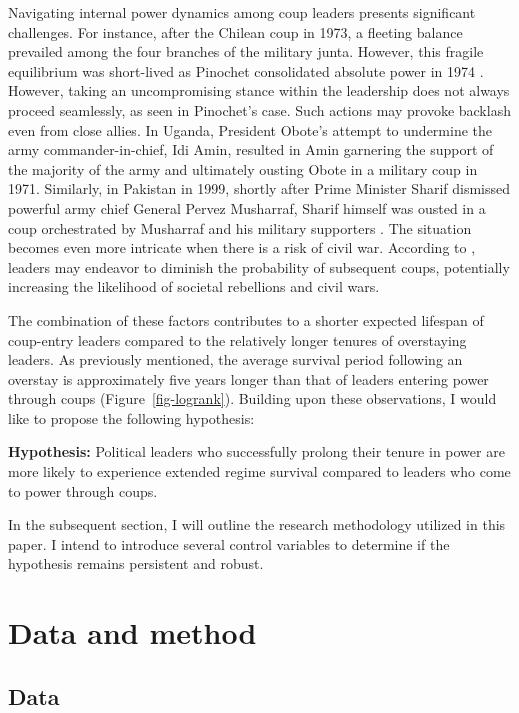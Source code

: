 \documentclass[
  12pt,
  a4paper,
  12pt]{article}
\begin{document}
Navigating internal power dynamics among coup leaders presents
significant challenges. For instance, after the Chilean coup in 1973, a
fleeting balance prevailed among the four branches of the military
junta. However, this fragile equilibrium was short-lived as Pinochet
consolidated absolute power in 1974 \citep{geddes2018}. However, taking
an uncompromising stance within the leadership does not always proceed
seamlessly, as seen in Pinochet's case. Such actions may provoke
backlash even from close allies. In Uganda, President Obote's attempt to
undermine the army commander-in-chief, Idi Amin, resulted in Amin
garnering the support of the majority of the army and ultimately ousting
Obote in a military coup in 1971. Similarly, in Pakistan in 1999,
shortly after Prime Minister Sharif dismissed powerful army chief
General Pervez Musharraf, Sharif himself was ousted in a coup
orchestrated by Musharraf and his military supporters
\citep{sudduth2017}. The situation becomes even more intricate when
there is a risk of civil war. According to \citet{roessler2011}, leaders
may endeavor to diminish the probability of subsequent coups,
potentially increasing the likelihood of societal rebellions and civil
wars.

The combination of these factors contributes to a shorter expected
lifespan of coup-entry leaders \citep{dahl2023} compared to the
relatively longer tenures of overstaying leaders. As previously
mentioned, the average survival period following an overstay is
approximately five years longer than that of leaders entering power
through coups (Figure~\ref{fig-logrank}). Building upon these
observations, I would like to propose the following hypothesis:

\textbf{Hypothesis:} Political leaders who successfully prolong their
tenure in power are more likely to experience extended regime survival
compared to leaders who come to power through coups.

In the subsequent section, I will outline the research methodology
utilized in this paper. I intend to introduce several control variables
to determine if the hypothesis remains persistent and robust.

\newpage

\section{Data and method}\label{data-and-method}

\subsection{Data}\label{data}
\end{document}
